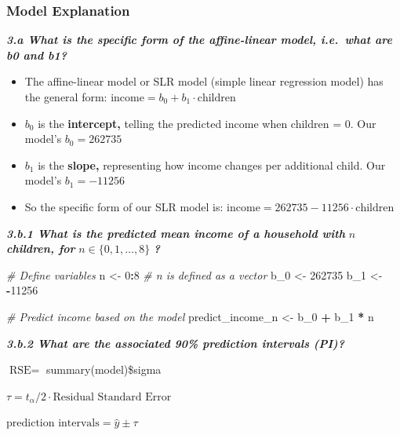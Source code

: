 \documentclass[
]{article}
\newenvironment{Shaded}{\begin{snugshade}}{\end{snugshade}}
\newcommand{\CommentTok}[1]{\textcolor[rgb]{0.56,0.35,0.01}{\textit{#1}}}
\newcommand{\DecValTok}[1]{\textcolor[rgb]{0.00,0.00,0.81}{#1}}
\newcommand{\NormalTok}[1]{#1}
\newcommand{\OtherTok}[1]{\textcolor[rgb]{0.56,0.35,0.01}{#1}}
\newcommand{\SpecialCharTok}[1]{\textcolor[rgb]{0.81,0.36,0.00}{\textbf{#1}}}
\begin{document}
\subsubsection{Model Explanation}\label{model-explanation}

\textbf{\emph{3.a What is the specific form of the affine-linear model,
i.e.~what are b0 and b1?}}

\begin{itemize}
\item
  The affine-linear model or SLR model (simple linear regression model)
  has the general form:
  \(\text{income} = b_0 + b_1 \cdot \text{children}\)
\item
  \(b_0\) is the \textbf{intercept,} telling the predicted income when
  children = 0. Our model's \(b_0= 262735\)
\item
  \(b_1\) is the \textbf{slope,} representing how income changes per
  additional child. Our model's \(b_1= -11256\)
\item
  So the specific form of our SLR model is:
  \(\text{income} = 262735 −11256 \cdot \text{children}\)
\end{itemize}

\textbf{\emph{3.b.1 What is the predicted mean income of a household
with}} \(𝑛\) \textbf{\emph{children, for}} \(n \in \{0,1,…,8\}\)
\textbf{\emph{?}}

\begin{Shaded}
\begin{Highlighting}[]
\CommentTok{\# Define variables}
\NormalTok{n }\OtherTok{\textless{}{-}} \DecValTok{0}\SpecialCharTok{:}\DecValTok{8}  \CommentTok{\# n is defined as a vector}
\NormalTok{b\_0 }\OtherTok{\textless{}{-}} \DecValTok{262735}
\NormalTok{b\_1 }\OtherTok{\textless{}{-}} \SpecialCharTok{{-}}\DecValTok{11256}

\CommentTok{\# Predict income based on the model}
\NormalTok{predict\_income\_n }\OtherTok{\textless{}{-}}\NormalTok{ b\_0 }\SpecialCharTok{+}\NormalTok{ b\_1 }\SpecialCharTok{*}\NormalTok{ n}
\end{Highlighting}
\end{Shaded}

\textbf{\emph{3.b.2 What are the associated 90\% prediction intervals
(PI)?}}

\(\text{RSE} =\) summary(model)\$sigma

\(\tau = t_\alpha/2 \cdot \text{Residual Standard Error}\)

\(\text{prediction intervals} = \hat{y} \pm \tau\)
\end{document}
